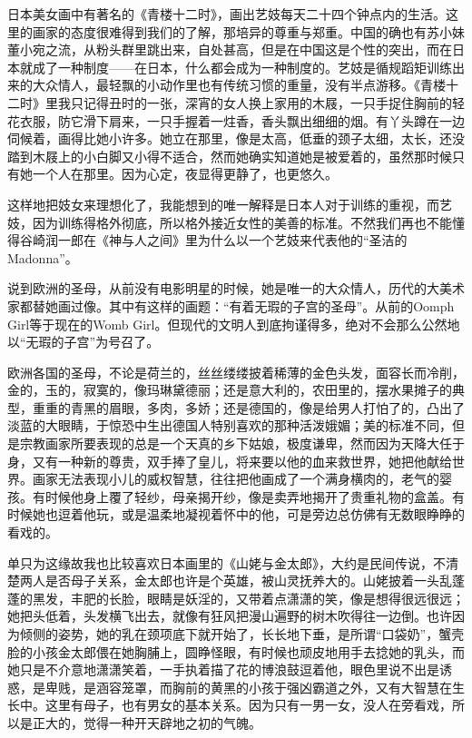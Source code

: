 \par 日本美女画中有著名的《青楼十二时》，画出艺妓每天二十四个钟点内的生活。这里的画家的态度很难得到我们的了解，那培异的尊重与郑重。中国的确也有苏小妹董小宛之流，从粉头群里跳出来，自处甚高，但是在中国这是个性的突出，而在日本就成了一种制度——在日本，什么都会成为一种制度的。艺妓是循规蹈矩训练出来的大众情人，最轻飘的小动作里也有传统习惯的重量，没有半点游移。《青楼十二时》里我只记得丑时的一张，深宵的女人换上家用的木屐，一只手捉住胸前的轻花衣服，防它滑下肩来，一只手握着一炷香，香头飘出细细的烟。有丫头蹲在一边伺候着，画得比她小许多。她立在那里，像是太高，低垂的颈子太细，太长，还没踏到木屐上的小白脚又小得不适合，然而她确实知道她是被爱着的，虽然那时候只有她一个人在那里。因为心定，夜显得更静了，也更悠久。
\par 这样地把妓女来理想化了，我能想到的唯一解释是日本人对于训练的重视，而艺妓，因为训练得格外彻底，所以格外接近女性的美善的标准。不然我们再也不能懂得谷崎润一郎在《神与人之间》里为什么以一个艺妓来代表他的“圣洁的Madonna”。
\par 说到欧洲的圣母，从前没有电影明星的时候，她是唯一的大众情人，历代的大美术家都替她画过像。其中有这样的画题：“有着无瑕的子宫的圣母”。从前的Oomph Girl等于现在的Womb Girl。但现代的文明人到底拘谨得多，绝对不会那么公然地以“无瑕的子宫”为号召了。
\par 欧洲各国的圣母，不论是荷兰的，丝丝缕缕披着稀薄的金色头发，面容长而冷削，金的，玉的，寂寞的，像玛琳黛德丽；还是意大利的，农田里的，摆水果摊子的典型，重重的青黑的眉眼，多肉，多娇；还是德国的，像是给男人打怕了的，凸出了淡蓝的大眼睛，于惊恐中生出德国人特别喜欢的那种活泼娥媚；美的标准不同，但是宗教画家所要表现的总是一个天真的乡下姑娘，极度谦卑，然而因为天降大任于身，又有一种新的尊贵，双手捧了皇儿，将来要以他的血来救世界，她把他献给世界。画家无法表现小儿的威权智慧，往往把他画成了一个满身横肉的，老气的婴孩。有时候他身上覆了轻纱，母亲揭开纱，像是卖弄地揭开了贵重礼物的盒盖。有时候她也逗着他玩，或是温柔地凝视着怀中的他，可是旁边总仿佛有无数眼睁睁的看戏的。
\par 单只为这缘故我也比较喜欢日本画里的《山姥与金太郎》，大约是民间传说，不清楚两人是否母子关系，金太郎也许是个英雄，被山灵抚养大的。山姥披着一头乱蓬蓬的黑发，丰肥的长脸，眼睛是妖淫的，又带着点潇潇的笑，像是想得很远很远；她把头低着，头发横飞出去，就像有狂风把漫山遍野的树木吹得往一边倒。也许因为倾侧的姿势，她的乳在颈项底下就开始了，长长地下垂，是所谓“口袋奶”，蟹壳脸的小孩金太郎偎在她胸脯上，圆睁怪眼，有时候也顽皮地用手去捻她的乳头，而她只是不介意地潇潇笑着，一手执着描了花的博浪鼓逗着他，眼色里说不出是诱惑，是卑贱，是涵容笼罩，而胸前的黄黑的小孩于强凶霸道之外，又有大智慧在生长中。这里有母子，也有男女的基本关系。因为只有一男一女，没人在旁看戏，所以是正大的，觉得一种开天辟地之初的气魄。
